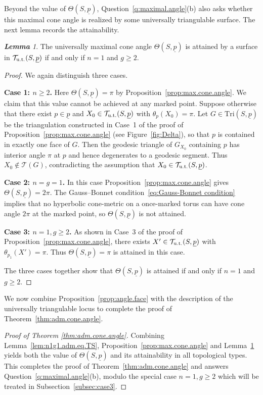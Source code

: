 \documentclass[11pt, letterpaper]{amsart}
\theoremstyle{definition}
\theoremstyle{remark}
\newtheorem{lemma}[theorem]{\rm\bf Lemma}
\newcommand{\up}{\underline{p}}
\newcommand{\Sp}{(S,\up)}
\newcommand{\TSp}{\text{Tri}\Sp}
\newcommand{\cT}{\mathcal{T}}
\numberwithin{equation}{section}
\begin{document}
Beyond the value of \(\Theta(S,\up)\), Question~\ref{q:maximal.angle}(b) also asks whether this maximal cone angle is realized by some universally triangulable surface.
The next lemma records the attainability.

\begin{lemma}
\label{lem:achived}
The universally maximal cone angle \(\Theta\Sp\) is attained by a surface in \(\cT_{\rm u.t.}\Sp\) if and only if \(n=1\) and \(g\geq 2\).
\end{lemma}

\begin{proof}
We again distinguish three cases.

\medskip\noindent\textbf{Case 1: \(n\geq 2\).}
Here \(\Theta\Sp=\pi\) by Proposition~\ref{prop:max.cone.angle}.
We claim that this value cannot be achieved at any marked point.
Suppose otherwise that there exist \(p\in\up\) and \(X_0\in\cT_{\rm u.t.}\Sp\) with \(\theta_p(X_0)=\pi\).
Let \(G\in\TSp\) be the triangulation constructed in Case~1 of the proof of Proposition~\ref{prop:max.cone.angle} (see Figure~\ref{fig:Delta}), so that \(p\) is contained in exactly one face of \(G\).
Then the geodesic triangle of \(G_{X_0}\) containing \(p\) has interior angle \(\pi\) at \(p\) and hence degenerates to a geodesic segment.
Thus \(X_0\notin\cT(G)\), contradicting the assumption that \(X_0\in\cT_{\rm u.t.}\Sp\).

\medskip\noindent\textbf{Case 2: \(n=g=1\).}
In this case Proposition~\ref{prop:max.cone.angle} gives \(\Theta\Sp=2\pi\).
The Gauss--Bonnet condition~\eqref{eq:Gauss-Bonnet condition} implies that no hyperbolic cone-metric on a once-marked torus can have cone angle \(2\pi\) at the marked point, so \(\Theta\Sp\) is not attained.

\medskip\noindent\textbf{Case 3: \(n=1, g\geq 2\).}
As shown in Case~3 of the proof of Proposition~\ref{prop:max.cone.angle}, there exists \(X'\in\cT_{\rm u.t.}\Sp\) with \(\theta_{p_1}(X')=\pi\).
Thus \(\Theta\Sp=\pi\) is attained in this case.

The three cases together show that \(\Theta\Sp\) is attained if and only if \(n=1\) and \(g\geq 2\).
\end{proof}

We now combine Proposition~\ref{prop:angle.face} with the description of the universally triangulable locus to complete the proof of Theorem~\ref{thm:adm.cone.angle}.

\begin{proof}[Proof of Theorem \ref{thm:adm.cone.angle}]
Combining Lemma~\ref{lem:n1g1.adm.eq.TS}, Proposition~\ref{prop:max.cone.angle} and Lemma~\ref{lem:achived} yields both the value of \(\Theta(S,\up)\) and its attainability in all topological types.
This completes the proof of Theorem~\ref{thm:adm.cone.angle} and answers Question~\ref{q:maximal.angle}(b), modulo the special case \(n=1, g\ge 2\) which will be treated in Subsection~\ref{subsec:case3}.
\end{proof}
\end{document}
